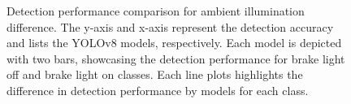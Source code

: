 \begin{figure}[t]%

    \hfill

\caption{Detection performance comparison for ambient illumination difference. The y-axis and x-axis represent the detection accuracy and lists the YOLOv8 models, respectively. Each model is depicted with two bars, showcasing the detection performance for brake light off and brake light on classes. Each line plots highlights the difference in detection performance by models for each class.}
\label{fig:dayNnight}%
\end{figure}

